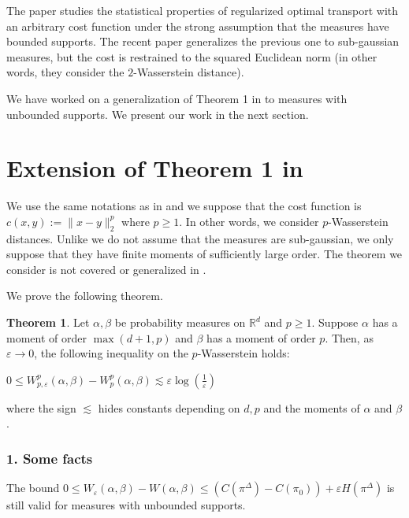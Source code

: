 \documentclass[12pt]{report}
\theoremstyle{definition}
\newtheorem*{thm*}{Theorem}
\theoremstyle{remark}
\begin{document}
\par The paper \cite{genevay2018sample} studies the statistical properties of regularized optimal transport with an arbitrary cost function under the strong assumption that the measures have bounded supports. The recent paper \cite{mena2019statistical} generalizes the previous one to sub-gaussian measures, but the cost is restrained to the squared Euclidean norm (in other words, they consider the $2$-Wasserstein distance).

\par We have worked on a generalization of Theorem 1 in \cite{genevay2018sample} to measures with unbounded supports. We present our work in the next section.

\newpage
\section{Extension of Theorem 1 in \cite{genevay2018sample}}

\hspace{\parindent} We use the same notations as in \cite{genevay2018sample} and we suppose that the cost function is $c(x,y):= \|x-y\|_2^p$ where $p\geq 1$. In other words, we consider $p$-Wasserstein distances. Unlike \cite{mena2019statistical} we do not assume that the measures are sub-gaussian, we only suppose that they have finite moments of sufficiently large order. The theorem we consider is not covered or generalized in \cite{mena2019statistical}.

We prove the following theorem.
\begin{thm*}
	Let $\alpha,\beta$ be probability measures on $\mathbb R^d$ and $p\geq 1$. Suppose $\alpha$ has a moment of order $\max(d+1,p)$ and $\beta$ has a moment of order $p$. Then, as $\varepsilon\to 0$, the following inequality on the $p$-Wasserstein holds: 
	\begin{center}
		$0 \leqslant W_{p,\varepsilon}^p(\alpha, \beta)-W_p^p(\alpha, \beta) \lesssim \varepsilon \log\left(\frac 1{\varepsilon} \right)$
	\end{center}
	where the sign $\lesssim$ hides constants depending on $d, p$ and the moments of $\alpha$ and $\beta$.
\end{thm*}

\subsubsection*{1. Some facts}
\hspace{\parindent}The bound $0 \leqslant W_{\varepsilon}(\alpha, \beta)-W(\alpha, \beta) \leqslant\left(C(\pi^{\Delta})-C(\pi_{0})\right)+\varepsilon H(\pi^{\Delta})$ is still valid for measures with unbounded supports. 
\end{document}
